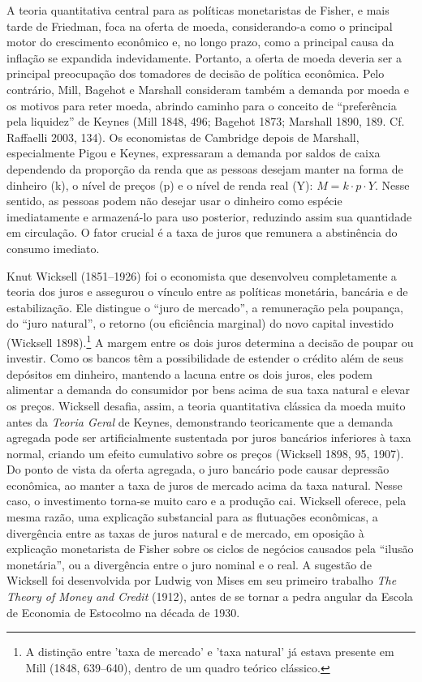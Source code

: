 \documentclass[12pt]{article}
\begin{document}
A teoria quantitativa central para as políticas monetaristas de Fisher, e mais tarde de Friedman, foca na oferta de moeda, considerando-a como o principal motor do crescimento econômico e, no longo prazo, como a principal causa da inflação se expandida indevidamente. Portanto, a oferta de moeda deveria ser a principal preocupação dos tomadores de decisão de política econômica. Pelo contrário, Mill, Bagehot e Marshall consideram também a demanda por moeda e os motivos para reter moeda, abrindo caminho para o conceito de “preferência pela liquidez” de Keynes (Mill 1848, 496; Bagehot 1873; Marshall 1890, 189. Cf. Raffaelli 2003, 134). Os economistas de Cambridge depois de Marshall, especialmente Pigou e Keynes, expressaram a demanda por saldos de caixa dependendo da proporção da renda que as pessoas desejam manter na forma de dinheiro (k), o nível de preços (p) e o nível de renda real (Y): $M = k \cdot p \cdot Y$. Nesse sentido, as pessoas podem não desejar usar o dinheiro como espécie imediatamente e armazená-lo para uso posterior, reduzindo assim sua quantidade em circulação. O fator crucial é a taxa de juros que remunera a abstinência do consumo imediato.

Knut Wicksell (1851–1926) foi o economista que desenvolveu completamente a teoria dos juros e assegurou o vínculo entre as políticas monetária, bancária e de estabilização. Ele distingue o “juro de mercado”, a remuneração pela poupança, do “juro natural”, o retorno (ou eficiência marginal) do novo capital investido (Wicksell 1898).\footnote{A distinção entre 'taxa de mercado' e 'taxa natural' já estava presente em Mill (1848, 639–640), dentro de um quadro teórico clássico.} A margem entre os dois juros determina a decisão de poupar ou investir. Como os bancos têm a possibilidade de estender o crédito além de seus depósitos em dinheiro, mantendo a lacuna entre os dois juros, eles podem alimentar a demanda do consumidor por bens acima de sua taxa natural e elevar os preços. Wicksell desafia, assim, a teoria quantitativa clássica da moeda muito antes da \textit{Teoria Geral} de Keynes, demonstrando teoricamente que a demanda agregada pode ser artificialmente sustentada por juros bancários inferiores à taxa normal, criando um efeito cumulativo sobre os preços (Wicksell 1898, 95, 1907). Do ponto de vista da oferta agregada, o juro bancário pode causar depressão econômica, ao manter a taxa de juros de mercado acima da taxa natural. Nesse caso, o investimento torna-se muito caro e a produção cai. Wicksell oferece, pela mesma razão, uma explicação substancial para as flutuações econômicas, a divergência entre as taxas de juros natural e de mercado, em oposição à explicação monetarista de Fisher sobre os ciclos de negócios causados pela “ilusão monetária”, ou a divergência entre o juro nominal e o real. A sugestão de Wicksell foi desenvolvida por Ludwig von Mises em seu primeiro trabalho \textit{The Theory of Money and Credit} (1912), antes de se tornar a pedra angular da Escola de Economia de Estocolmo na década de 1930.
\end{document}
